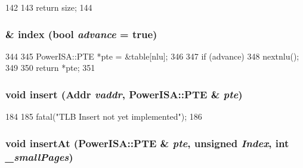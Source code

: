 \begin{DoxyCode}
142     {
143         return size;
144     }
\end{DoxyCode}
\hypertarget{classPowerISA_1_1TLB_a966acb0c92e034836f2ee489cb83ddd3}{
\subsubsection[{index}]{ \& index (bool {\em advance} = {\ttfamily true})}}
\label{classPowerISA_1_1TLB_a966acb0c92e034836f2ee489cb83ddd3}



\begin{DoxyCode}
344 {
345     PowerISA::PTE *pte = &table[nlu];
346 
347     if (advance)
348         nextnlu();
349 
350     return *pte;
351 }
\end{DoxyCode}
\hypertarget{classPowerISA_1_1TLB_a347b46782c03effd910740f90bd915b4}{
\subsubsection[{insert}]{\setlength{\rightskip}{0pt plus 5cm}void insert ({\bf Addr} {\em vaddr}, \/  {\bf PowerISA::PTE} \& {\em pte})}}
\label{classPowerISA_1_1TLB_a347b46782c03effd910740f90bd915b4}



\begin{DoxyCode}
184 {
185     fatal("TLB Insert not yet implemented\n");
186 }
\end{DoxyCode}
\hypertarget{classPowerISA_1_1TLB_a79de97f3cd3b55bcd2fbf31c5d3b8a12}{
\subsubsection[{insertAt}]{\setlength{\rightskip}{0pt plus 5cm}void insertAt ({\bf PowerISA::PTE} \& {\em pte}, \/  unsigned {\em Index}, \/  int {\em \_\-smallPages})}}
\label{classPowerISA_1_1TLB_a79de97f3cd3b55bcd2fbf31c5d3b8a12}



